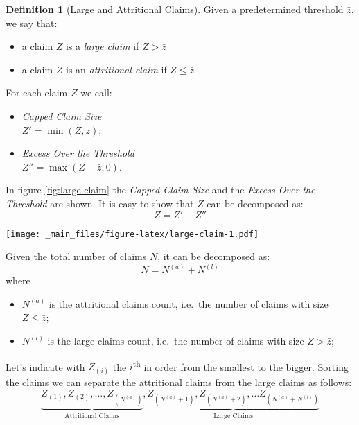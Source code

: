 \documentclass[a4paper, twoside, openright, 12pt]{report}
\let\origfigure\figure
\let\endorigfigure\endfigure
\renewenvironment{figure}[1][2] {
  \expandafter\origfigure\expandafter[!hbtp]
} {
  \endorigfigure
}
\providecommand{\tightlist}{%
  \setlength{\itemsep}{0pt}\setlength{\parskip}{0pt}}
\theoremstyle{definition}
\newtheorem{definition}{Definition}[chapter]
\theoremstyle{definition}
\theoremstyle{definition}
\theoremstyle{remark}
\begin{document}
\begin{definition}[Large and Attritional Claims]
\label{def:def-large-claim} \iffalse (Large and Attritional Claims) \fi{} Given a predetermined threshold \(\bar{z}\), we say that:

\begin{itemize}
\item a claim $Z$ is a \textit{large claim} if $Z > \bar{z}$
\item a claim $Z$ is an \textit{attritional claim} if $Z \le \bar{z}$
\end{itemize}

For each claim \(Z\) we call:

\begin{itemize}
\item \textit{Capped Claim Size} \\
      $Z' = \min(Z, \bar{z})$;
\item \textit{Excess Over the Threshold} \\
      $Z'' = \max(Z - \bar{z}, 0)$.
\end{itemize}
\end{definition}

In figure \ref{fig:large-claim} the \emph{Capped Claim Size} and the \emph{Excess Over the Threshold} are shown. It is easy to show that \(Z\) can be decomposed as:
\[Z = Z' + Z''\]

\begin{figure}
\centering
\texttt{[image: \_main\_files/figure-latex/large-claim-1.pdf]}
\caption{\label{fig:large-claim}Large claims.}
\end{figure}

Given the total number of claims \(N\), it can be decomposed as:
\[N = N^{(a)} + N^{(l)}\]
where

\begin{itemize}
\tightlist
\item
  \(N^{(a)}\) is the attritional claims count, i.e.~the number of claims with size \(Z \le \bar{z}\);
\item
  \(N^{(l)}\) is the large claims count, i.e.~the number of claims with size \(Z > \bar{z}\);
\end{itemize}

Let's indicate with \(Z_{(i)}\) the \(i\)\textsuperscript{th} in order from the smallest to the bigger. Sorting the claims we can separate the attritional claims from the large claims as follows:
\[
\underbrace{Z_{(1)}, Z_{(2)}, \dots, Z_{(N^{(a)})}}_{\text{Attritional Claims}},
\underbrace{Z_{(N^{(a)} + 1)}, Z_{(N^{(a)} + 2)}, \dots Z_{(N^{(a)} + N^{(l)})}}_{\text{Large Claims}}
\]
\end{document}
